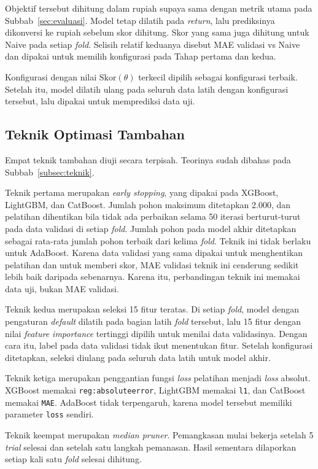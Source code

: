 Objektif tersebut dihitung dalam rupiah supaya sama dengan metrik utama pada
Subbab~\ref{sec:evaluasi}. Model tetap dilatih pada \textit{return}, lalu
prediksinya dikonversi ke rupiah sebelum skor dihitung. Skor yang sama juga
dihitung untuk Naive pada setiap \textit{fold}. Selisih relatif keduanya
disebut MAE validasi vs Naive dan dipakai untuk memilih konfigurasi pada
Tahap pertama dan kedua.

Konfigurasi dengan nilai $\mathrm{Skor}(\theta)$ terkecil dipilih sebagai
konfigurasi terbaik. Setelah itu, model dilatih ulang pada seluruh data latih
dengan konfigurasi tersebut, lalu dipakai untuk memprediksi data uji.

\subsection{Teknik Optimasi Tambahan}
Empat teknik tambahan diuji secara terpisah. Teorinya sudah dibahas pada
Subbab~\ref{subsec:teknik}.

Teknik pertama merupakan \textit{early stopping}, yang dipakai pada XGBoost,
LightGBM, dan CatBoost. Jumlah pohon maksimum ditetapkan 2.000, dan pelatihan
dihentikan bila tidak ada perbaikan selama 50 iterasi berturut-turut pada
data validasi di setiap \textit{fold}. Jumlah pohon pada model akhir
ditetapkan sebagai rata-rata jumlah pohon terbaik dari kelima \textit{fold}.
Teknik ini tidak berlaku untuk AdaBoost. Karena data validasi yang sama dipakai
untuk menghentikan pelatihan dan untuk memberi skor, MAE validasi teknik ini
cenderung sedikit lebih baik daripada sebenarnya. Karena itu, perbandingan
teknik ini memakai data uji, bukan MAE validasi.

Teknik kedua merupakan seleksi 15 fitur teratas. Di setiap \textit{fold},
model dengan pengaturan \textit{default} dilatih pada bagian latih
\textit{fold} tersebut, lalu 15 fitur dengan nilai \textit{feature importance}
tertinggi dipilih untuk menilai data validasinya. Dengan cara itu, label pada
data validasi tidak ikut menentukan fitur. Setelah konfigurasi ditetapkan,
seleksi diulang pada seluruh data latih untuk model akhir.

Teknik ketiga merupakan penggantian fungsi \textit{loss} pelatihan menjadi
\textit{loss} absolut. XGBoost memakai \texttt{reg:absoluteerror}, LightGBM
memakai \texttt{l1}, dan CatBoost memakai \texttt{MAE}. AdaBoost tidak
terpengaruh, karena model tersebut memiliki parameter \texttt{loss} sendiri.

Teknik keempat merupakan \textit{median pruner}. Pemangkasan mulai bekerja
setelah 5 \textit{trial} selesai dan setelah satu langkah pemanasan. Hasil
sementara dilaporkan setiap kali satu \textit{fold} selesai dihitung.

